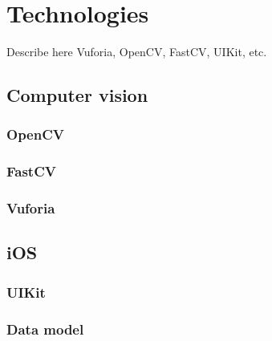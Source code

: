 \chapter{Technologies}
Describe here Vuforia, OpenCV, FastCV, UIKit, etc.
\section{Computer vision}
\subsection{OpenCV}
\subsection{FastCV}
\subsection{Vuforia}

\section{iOS}
\subsection{UIKit}
\subsection{Data model}
